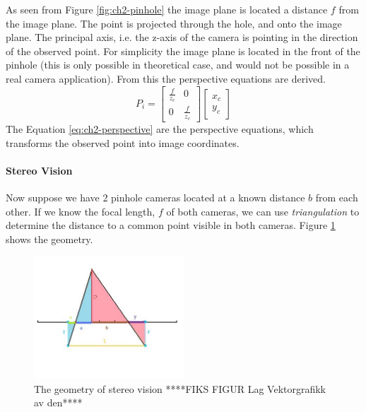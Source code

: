 	As seen from Figure \ref{fig:ch2-pinhole} the image plane is located a distance $f$ from the image plane. 
	The point is projected through the hole, and onto the image plane. The principal axis, i.e. the z-axis of the
	camera is pointing
	in the direction of the observed point. For simplicity the image plane is located in the front of the
	pinhole (this is only possible in theoretical case, and would not be possible in a real camera application).
    From this the perspective equations are derived. \cite{robotbok}
	\begin{equation}
		\label{eq:ch2-perspective}
		P_i = \left[ \begin{array}{cc}
					\frac{f}{z_c} & 0 \\
					0	& \frac{f}{z_c} 
				\end{array} \right] 
				\left[ \begin{array}{c}
					x_c \\
					y_c
					\end{array} \right]
	\end{equation}
	The Equation \eqref{eq:ch2-perspective} are the perspective equations, which transforms the observed 
	point into image coordinates. 


\paragraph{Stereo Vision}
    Now suppose we have 2 pinhole cameras located at a known distance $b$ from each other. 
    If we know the focal length, $f$ of both cameras, we can use \emph{triangulation} to
    determine the distance to a common point visible in both cameras. Figure
    \ref{fig:ch2-stereo_geometry} shows the geometry. 
    \begin{figure}[htbp]
        \centering
        \includegraphics[width=0.5\textwidth]{pics/stereo_geometry}
        \caption{The geometry of stereo vision ****FIKS FIGUR Lag Vektorgrafikk av den****}
        \label{fig:ch2-stereo_geometry}
    \end{figure}

